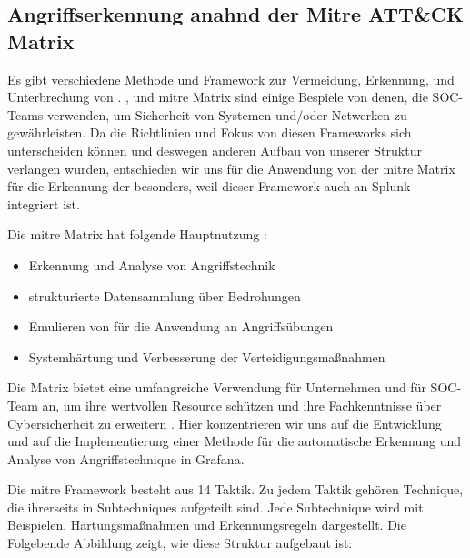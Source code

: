 \subsection{Angriffserkennung anahnd der Mitre ATT\&CK Matrix\textregistered}
Es gibt verschiedene Methode und Framework zur Vermeidung, Erkennung, und Unterbrechung von . ,  und \gls{mitre} Matrix sind einige Bespiele von denen, die \gls{SOC}-Teams verwenden, um Sicherheit von Systemen und/oder Netwerken zu gewährleisten. Da die Richtlinien und Fokus von diesen Frameworks sich unterscheiden können und deswegen anderen Aufbau von unserer Struktur verlangen wurden, entschieden wir uns für die Anwendung von der \gls{mitre} Matrix für die Erkennung der  besonders, weil dieser Framework auch an Splunk integriert ist.

\newpage
Die \gls{mitre} Matrix hat folgende Hauptnutzung \citep{Mitre_Started}:

\begin{itemize}[noitemsep]
   \item Erkennung und Analyse von Angriffstechnik
   \item	strukturierte Datensammlung über Bedrohungen
   \item	Emulieren von  für die Anwendung an Angriffsübungen
   \item	Systemhärtung und Verbesserung der Verteidigungsmaßnahmen
\end{itemize}

Die Matrix bietet eine umfangreiche Verwendung für Unternehmen und für \gls{SOC}-Team an, um ihre wertvollen Resource schützen und ihre Fachkenntnisse über \gls{Cybersicherheit} zu erweitern \citep{Hazel_howtousemitre}. Hier konzentrieren wir uns auf die Entwicklung und auf die Implementierung einer Methode für die automatische Erkennung und Analyse von Angriffstechnique in Grafana.

Die \gls{mitre} Framework besteht aus 14 Taktik. Zu jedem Taktik gehören Technique, die ihrerseits in Subtechniques aufgeteilt sind. Jede Subtechnique wird mit Beispielen, Härtungsmaßnahmen und Erkennungsregeln dargestellt. Die Folgebende Abbildung zeigt, wie diese Struktur aufgebaut ist: 

